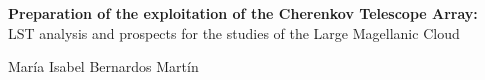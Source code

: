 \documentclass[12pt,fleqn]{book} %
\begin{document}
\begingroup
\thispagestyle{empty}
\centering
\vspace*{5cm}
\par\normalfont\fontsize{32}{32}\sffamily\selectfont
\textbf{Preparation of the exploitation of the Cherenkov Telescope Array:}\\
{\LARGE LST analysis and prospects for the studies of the Large Magellanic Cloud}\par %
\vspace*{0.7cm}
{\Huge María Isabel Bernardos Martín}\par %
\endgroup


\newpage
~\vfill
\thispagestyle{empty}
\end{document}
